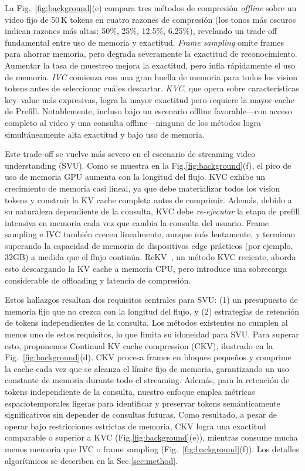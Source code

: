 La Fig.~\ref{fig:background}(e) compara tres métodos de compresión \textit{offline} sobre un video fijo de 50\,K tokens en cuatro razones de compresión (los tonos más oscuros indican razones más altas: 50\%, 25\%, 12.5\%, 6.25\%), revelando un trade-off fundamental entre uso de memoria y exactitud. \textit{Frame sampling} omite frames para ahorrar memoria, pero degrada severamente la exactitud de reconocimiento. Aumentar la tasa de muestreo mejora la exactitud, pero infla rápidamente el uso de memoria. \textit{IVC} comienza con una gran huella de memoria para todos los vision tokens antes de seleccionar cuáles descartar. \textit{KVC}, que opera sobre características key--value más expresivas, logra la mayor exactitud pero requiere la mayor cache de Prefill. Notablemente, incluso bajo un escenario offline favorable---con acceso completo al video y una consulta offline---ninguno de los métodos logra simultáneamente alta exactitud y bajo uso de memoria.

Este trade-off se vuelve más severo en el escenario de streaming video understanding (SVU). Como se muestra en la Fig.\ref{fig:background}(f), el pico de uso de memoria GPU aumenta con la longitud del flujo. KVC exhibe un crecimiento de memoria casi lineal, ya que debe materializar todos los vision tokens y construir la KV cache completa antes de comprimir. Además, debido a su naturaleza dependiente de la consulta, KVC debe \textit{re-ejecutar} la etapa de prefill intensiva en memoria cada vez que cambia la consulta del usuario. Frame sampling e IVC también crecen linealmente, aunque más lentamente, y terminan superando la capacidad de memoria de dispositivos edge prácticos (por ejemplo, 32GB\cite{Karumbunathan2022JetsonAGXOrin}) a medida que el flujo continúa. ReKV~\cite{Shangzhe2025streaming}, un método KVC reciente, aborda esto descargando la KV cache a memoria CPU, pero introduce una sobrecarga considerable de offloading y latencia de compresión. 

Estos hallazgos resaltan dos requisitos centrales para SVU: (1) un presupuesto de memoria fijo que no crezca con la longitud del flujo, y (2) estrategias de retención de tokens independientes de la consulta. Los métodos existentes no cumplen al menos uno de estos requisitos, lo que limita su idoneidad para SVU. 
Para superar esto, proponemos Continual KV cache compression (CKV), ilustrado en la Fig.~\ref{fig:background}(d). CKV procesa frames en bloques pequeños y comprime la cache cada vez que se alcanza el límite fijo de memoria, garantizando un uso constante de memoria durante todo el streaming. Además, para la retención de tokens independiente de la consulta, nuestro enfoque emplea métricas espaciotemporales ligeras para identificar y preservar tokens semánticamente significativos sin depender de consultas futuras. Como resultado, a pesar de operar bajo restricciones estrictas de memoria, CKV logra una exactitud comparable o superior a KVC (Fig.\ref{fig:background}(e)), mientras consume mucha menos memoria que IVC o frame sampling (Fig.~\ref{fig:background}(f)). Los detalles algorítmicos se describen en la Sec.\ref{sec:method}.
